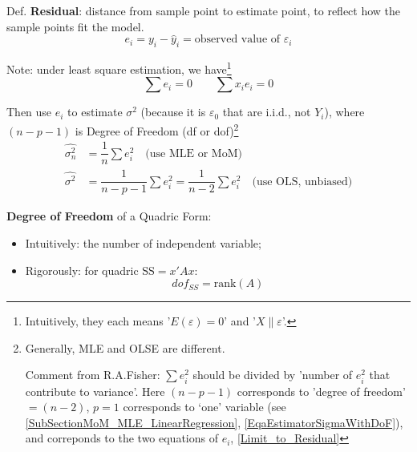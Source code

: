     
    Def. \textbf{Residual}: distance from sample point to estimate point, to reflect how the sample points fit the model.
    \begin{equation}
        e_i=y_i-\hat{y}_i=\text{observed value of }\varepsilon _i 
    \end{equation}
    
    Note: under least square estimation, we have\footnote{Intuitively, they each means '$ E(\varepsilon )=0 $' and '$ X\parallel \varepsilon  $'.}
\begin{equation}\label{Limit_to_Residual}
        \sum e_i=0\qquad \sum x_ie_i=0 
\end{equation}
    

    Then use $ e_i $ to estimate $ \sigma ^2 $ (because it is $ \varepsilon _0 $ that are i.i.d., not $ Y_i $), where $ (n-p-1) $ is Degree of Freedom (df or dof)\footnote{Generally, MLE and OLSE are different.

    Comment from R.A.Fisher: $ \sum e_i^2 $ should be divided by 'number of $ e_i^2 $ that contribute to variance'. Here $ (n-p-1) $ corresponds to 'degree of freedom' $ =(n-2) $, $ p=1 $ corresponds to `one' variable (see \autoref{SubSectionMoM_MLE_LinearRegression}, \autoref{EqaEstimatorSigmaWithDoF}), and correponds to the two equations of $ e_i $, \autoref{Limit_to_Residual}}
\begin{equation}\label{EqaOLSEstimatorOfSigma}
    \begin{aligned}
        \hat{\sigma _n^2}&=\dfrac{1}{n}\sum e_i^2 \quad\text{(use MLE or MoM)}\\
        \hat{\sigma^2}&=\dfrac{1}{n-p-1}\sum e_i^2=\dfrac{1}{n-2}\sum e_i^2\quad\text{(use OLS, unbiased)}
\end{aligned}
\end{equation}

\textbf{Degree of Freedom} of a Quadric Form:
\begin{itemize}[topsep=2pt,itemsep=2pt]
    \item Intuitively: the number of independent variable;
    \item Rigorously: for quadric $ \mathrm{SS}=x'Ax $:
    \begin{equation}\label{EqaDefinitionOfDegreeOfFreedom}
        dof_{SS}=\mathrm{rank}(A)
    \end{equation}
    
    
    
\end{itemize}

